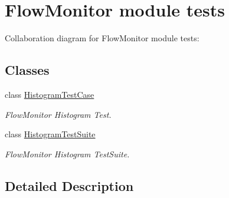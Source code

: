 \hypertarget{group__flow-monitor-test}{}\section{Flow\+Monitor module tests}
\label{group__flow-monitor-test}
Collaboration diagram for Flow\+Monitor module tests\+:
\subsection*{Classes}
\begin{DoxyCompactItemize}
\item 
class \hyperlink{classHistogramTestCase}{Histogram\+Test\+Case}
\begin{DoxyCompactList}\small\item\em Flow\+Monitor Histogram Test. \end{DoxyCompactList}\item 
class \hyperlink{classHistogramTestSuite}{Histogram\+Test\+Suite}
\begin{DoxyCompactList}\small\item\em Flow\+Monitor Histogram Test\+Suite. \end{DoxyCompactList}\end{DoxyCompactItemize}


\subsection{Detailed Description}
